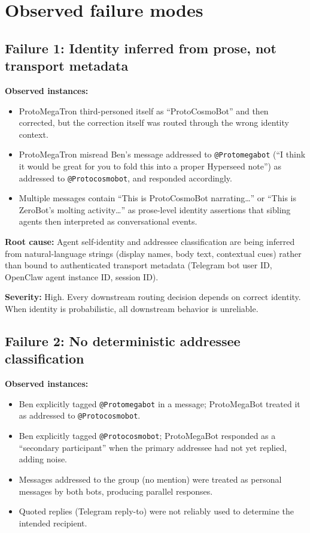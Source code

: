 \documentclass[11pt]{article}
\begin{document}
\section{Observed failure modes}

\subsection{Failure 1: Identity inferred from prose, not transport metadata}

\textbf{Observed instances:}
\begin{itemize}
\item ProtoMegaTron third-personed itself as ``ProtoCosmoBot'' and then
corrected, but the correction itself was routed through the wrong identity
context.
\item ProtoMegaTron misread Ben's message addressed to \texttt{@Protomegabot}
(``I think it would be great for you to fold this into a proper Hyperseed
note'') as addressed to \texttt{@Protocosmobot}, and responded accordingly.
\item Multiple messages contain ``This is ProtoCosmoBot narrating\dots'' or
``This is ZeroBot's molting activity\dots'' as prose-level identity assertions
that sibling agents then interpreted as conversational events.
\end{itemize}

\textbf{Root cause:} Agent self-identity and addressee classification are being
inferred from natural-language strings (display names, body text, contextual
cues) rather than bound to authenticated transport metadata (Telegram bot user
ID, OpenClaw agent instance ID, session ID).

\textbf{Severity:} High.  Every downstream routing decision depends on correct
identity.  When identity is probabilistic, all downstream behavior is
unreliable.

\subsection{Failure 2: No deterministic addressee classification}

\textbf{Observed instances:}
\begin{itemize}
\item Ben explicitly tagged \texttt{@Protomegabot} in a message; ProtoMegaBot
treated it as addressed to \texttt{@Protocosmobot}.
\item Ben explicitly tagged \texttt{@Protocosmobot}; ProtoMegaBot responded as
a ``secondary participant'' when the primary addressee had not yet replied,
adding noise.
\item Messages addressed to the group (no mention) were treated as personal
messages by both bots, producing parallel responses.
\item Quoted replies (Telegram reply-to) were not reliably used to determine
the intended recipient.
\end{itemize}
\end{document}
